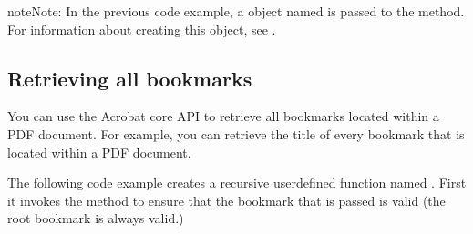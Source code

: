 \documentclass[letterpaper,12pt,english,openany,oneside]{sphinxmanual}
\begin{document}
\begin{sphinxVerbatim}[commandchars=\\\{\}]
      
  
   


   
  


   
      
  
\end{sphinxVerbatim}

\begin{sphinxadmonition}{note}{Note:}
In the previous code example, a  object named  is passed to the  method. For information about creating this object, see .
\end{sphinxadmonition}


\subsection{Retrieving all bookmarks}
\label{\detokenize{Plugins_Bookmark:retrieving-all-bookmarks}}
You can use the Acrobat core API to retrieve all bookmarks located within a PDF document. For example, you can retrieve the title of every bookmark that is located within a PDF document.

The following code example creates a recursive user\sphinxhyphen{}defined function named . First it invokes the  method to ensure that the bookmark that is passed is valid (the root bookmark is always valid.)
\end{document}
